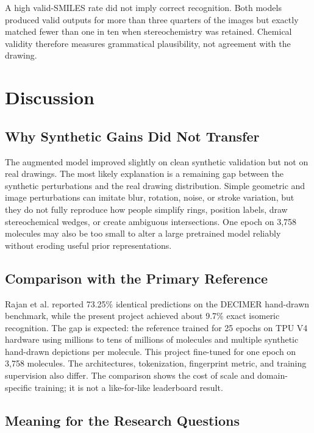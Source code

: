 \documentclass[11pt,a4paper]{article}
\begin{document}
A high valid-SMILES rate did not imply correct recognition. Both models produced valid outputs
for more than three quarters of the images but exactly matched fewer than one in ten when
stereochemistry was retained. Chemical validity therefore measures grammatical plausibility,
not agreement with the drawing.

\section*{Discussion}

\subsection*{Why Synthetic Gains Did Not Transfer}

The augmented model improved slightly on clean synthetic validation but not on real drawings.
The most likely explanation is a remaining gap between the synthetic perturbations and the real
drawing distribution. Simple
geometric and image perturbations can imitate blur, rotation, noise, or stroke variation, but
they do not fully reproduce how people simplify rings, position labels, draw stereochemical
wedges, or create ambiguous intersections. One epoch on 3,758 molecules may also be too small
to alter a large pretrained model reliably without eroding useful prior representations.

\subsection*{Comparison with the Primary Reference}

Rajan et al. reported 73.25\% identical predictions on the DECIMER hand-drawn benchmark,
while the present project achieved about 9.7\% exact isomeric recognition. The gap is expected:
the reference trained for 25 epochs on TPU V4 hardware using millions to tens of millions of
molecules and multiple synthetic hand-drawn depictions per molecule. This project fine-tuned
for one epoch on 3,758 molecules. The architectures, tokenization, fingerprint metric, and
training supervision also differ. The comparison shows the cost of scale and domain-specific
training; it is not a like-for-like leaderboard result.

\subsection*{Meaning for the Research Questions}
\end{document}
